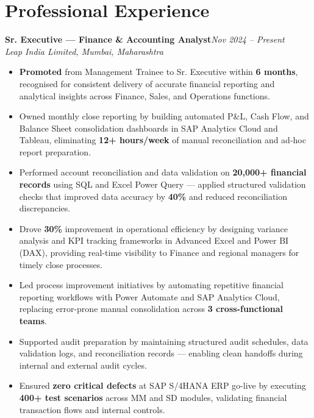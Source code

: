 \documentclass[10pt, letterpaper]{article}
\newcommand{\role}[3]{%
  \vspace{2pt}%
  {\bfseries #1}\hfill{\small\color{muted}\textit{#3}}\\[-2pt]%
  {\small\color{muted}\textit{#2}}%
}
\begin{document}
\section{Professional Experience}

\role{Sr. Executive — Finance \& Accounting Analyst}{Leap India Limited, Mumbai, Maharashtra}{Nov 2024 – Present}

\begin{itemize}
  \item \textbf{Promoted} from Management Trainee to Sr. Executive within \textbf{6 months}, recognised for consistent delivery of accurate financial reporting and analytical insights across Finance, Sales, and Operations functions.
  \item Owned monthly close reporting by building automated P\&L, Cash Flow, and Balance Sheet consolidation dashboards in SAP Analytics Cloud and Tableau, eliminating \textbf{12+ hours/week} of manual reconciliation and ad-hoc report preparation.
  \item Performed account reconciliation and data validation on \textbf{20,000+ financial records} using SQL and Excel Power Query — applied structured validation checks that improved data accuracy by \textbf{40\%} and reduced reconciliation discrepancies.
  \item Drove \textbf{30\%} improvement in operational efficiency by designing variance analysis and KPI tracking frameworks in Advanced Excel and Power BI (DAX), providing real-time visibility to Finance and regional managers for timely close processes.
  \item Led process improvement initiatives by automating repetitive financial reporting workflows with Power Automate and SAP Analytics Cloud, replacing error-prone manual consolidation across \textbf{3 cross-functional teams}.
  \item Supported audit preparation by maintaining structured audit schedules, data validation logs, and reconciliation records — enabling clean handoffs during internal and external audit cycles.
  \item Ensured \textbf{zero critical defects} at SAP S/4HANA ERP go-live by executing \textbf{400+ test scenarios} across MM and SD modules, validating financial transaction flows and internal controls.
\end{itemize}

\vspace{1pt}
\end{document}
